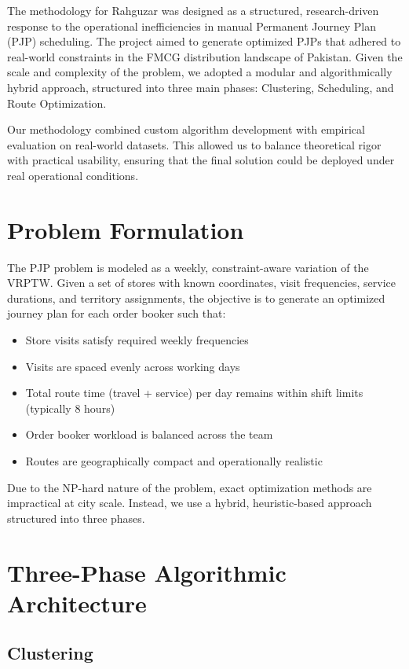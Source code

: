 
The methodology for Rahguzar was designed as a structured, research-driven response to the operational inefficiencies in manual Permanent Journey Plan (PJP) scheduling. The project aimed to generate optimized PJPs that adhered to real-world constraints in the FMCG distribution landscape of Pakistan. Given the scale and complexity of the problem, we adopted a modular and algorithmically hybrid approach, structured into three main phases: Clustering, Scheduling, and Route Optimization.

Our methodology combined custom algorithm development with empirical evaluation on real-world datasets. This allowed us to balance theoretical rigor with practical usability, ensuring that the final solution could be deployed under real operational conditions.


\section{Problem Formulation}

The PJP problem is modeled as a weekly, constraint-aware variation of the VRPTW. Given a set of stores with known coordinates, visit frequencies, service durations, and territory assignments, the objective is to generate an optimized journey plan for each order booker such that:

\begin{itemize}
  \item Store visits satisfy required weekly frequencies
  \item Visits are spaced evenly across working days
  \item Total route time (travel + service) per day remains within shift limits (typically 8 hours)
  \item Order booker workload is balanced across the team
  \item Routes are geographically compact and operationally realistic
\end{itemize}

Due to the NP-hard nature of the problem, exact optimization methods are impractical at city scale. Instead, we use a hybrid, heuristic-based approach structured into three phases.

\section{Three-Phase Algorithmic Architecture}

\subsection{Clustering}

